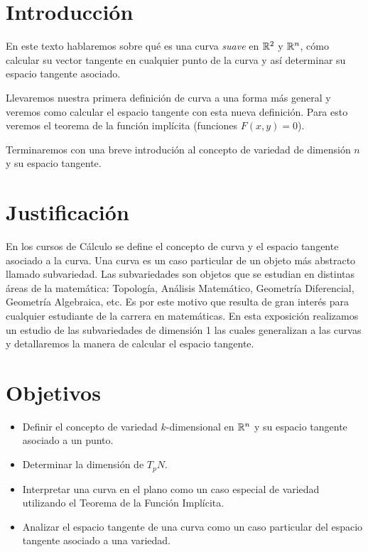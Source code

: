 \section{Introducción}
En este texto hablaremos sobre qué es una curva \emph{suave} en $\mathbb{R}^{2}$ y $\mathbb{R}^{n}$, cómo calcular su vector tangente en cualquier punto de la curva y así determinar
su espacio tangente asociado.

Llevaremos nuestra primera definición de curva a una forma más general y veremos como calcular el espacio tangente con esta nueva definición. Para esto veremos el teorema
de la función implícita (funciones $F(x,y)=0$).

Terminaremos con una breve introdución al concepto de variedad de dimensi\'on $n$ y su espacio tangente.
\section{Justificación}
En los cursos de Cálculo se define el concepto de curva y el espacio tangente asociado a la curva. Una curva es un caso particular de un objeto más abstracto llamado subvariedad. Las subvariedades son objetos que se estudian en distintas áreas de la matemática: Topología, Análisis Matemático, Geometría Diferencial, Geometría Algebraica, etc. Es por este motivo que resulta de gran interés para cualquier estudiante de la carrera en matemáticas. En esta exposición realizamos un estudio de las subvariedades de dimensión 1 las cuales generalizan a las curvas y detallaremos la manera de calcular el espacio tangente.

\section{Objetivos}
\begin{itemize}
    \item Definir el concepto de variedad $k$-dimensional en $\mathbb{R}^{n}$ y su espacio tangente asociado a un punto.
    \item Determinar la dimensi\'on de $T_{p}N$.
    \item Interpretar una curva en el plano como un caso especial de variedad utilizando el Teorema de la Funci\'on Impl\'icita.
    \item Analizar el espacio tangente de una curva como un caso particular del espacio tangente asociado a una variedad.
\end{itemize}


